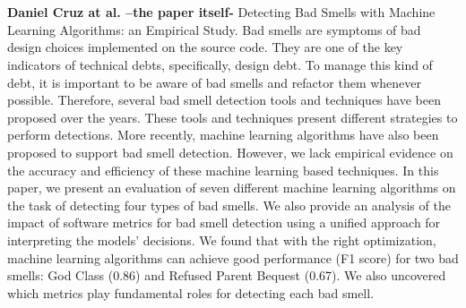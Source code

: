 \\
\\
\textbf{Daniel Cruz at al. --the paper itself-}
Detecting Bad Smells with Machine Learning Algorithms: an Empirical Study.
Bad smells are symptoms of bad design choices implemented on the source code. They are one of the key indicators of technical debts, specifically, design debt. To manage this kind of debt, it is important to be aware of bad smells and refactor them whenever possible. Therefore, several bad smell detection tools and techniques have been proposed over the years. These tools and techniques present different strategies to perform detections. More recently, machine learning algorithms have also been proposed to support bad smell detection. However, we lack empirical evidence on the accuracy and efficiency of these machine learning based techniques. In this paper, we present an evaluation of seven different machine learning algorithms on the task of detecting four types of bad smells. We also provide an analysis of the impact of software metrics for bad smell detection using a unified approach for interpreting the models’ decisions. We found that with the right optimization, machine learning algorithms can achieve good performance (F1 score) for two bad smells: God Class (0.86) and Refused Parent Bequest (0.67). We also uncovered which metrics play fundamental roles for detecting each bad smell.
\\
\\
